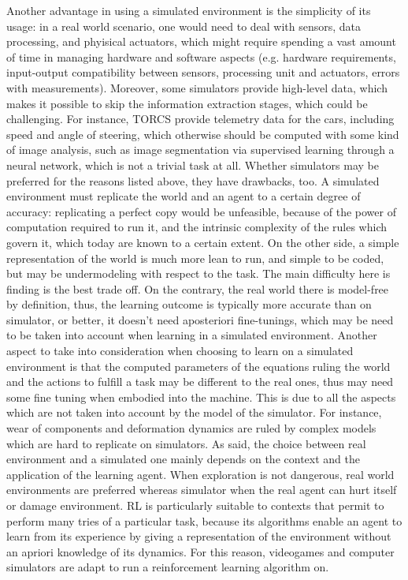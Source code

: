 Another advantage in using a simulated environment is the simplicity of its usage: in a real world scenario, one would need to deal with sensors, data processing, and phyisical actuators, which might require spending a vast amount of time in managing hardware and software aspects (e.g. hardware requirements, input-output compatibility between sensors, processing unit and actuators, errors with measurements). Moreover, some simulators provide high-level data, which makes it possible to skip the information extraction stages, which could be challenging. For instance, TORCS provide telemetry data for the cars, including speed and angle of steering, which otherwise should be computed with some kind of image analysis, such as image segmentation via supervised learning through a neural network, which is not a trivial task at all.
Whether simulators may be preferred for the reasons listed above, they have drawbacks, too. A simulated environment must replicate the world and an agent to a certain degree of accuracy: replicating a perfect copy would be unfeasible, because of the power of computation required to run it, and the intrinsic complexity of the rules which govern it, which today are known to a certain extent. On the other side, a simple representation of the world is much more lean to run, and simple to be coded, but may be undermodeling with respect to the task. The main difficulty here is finding is the best trade off. On the contrary, the real world there is model-free by definition, thus, the learning outcome is typically more accurate than on simulator, or better, it doesn't need aposteriori fine-tunings, which may be need to be taken into account when learning in a simulated environment. 
Another aspect to take into consideration when choosing to learn on a simulated environment is that the computed parameters of the equations ruling the world and the actions to fulfill a task may be different to the real ones, thus may need some fine tuning when embodied into the machine. This is due to all the aspects which are not taken into account by the model of the simulator. For instance, wear of components and deformation dynamics are ruled by complex models which are hard to replicate on simulators.
As said, the choice between real environment and a simulated one mainly depends on the context and the application of the learning agent. When exploration is not dangerous, real world environments are preferred whereas simulator when the real agent can hurt itself or damage environment.
RL is particularly suitable to contexts that permit to perform many tries of a particular task, because its algorithms enable an agent to learn from its experience by giving a representation of the environment without an apriori knowledge of its dynamics. For this reason, videogames and computer simulators are adapt to run a reinforcement learning algorithm on.
